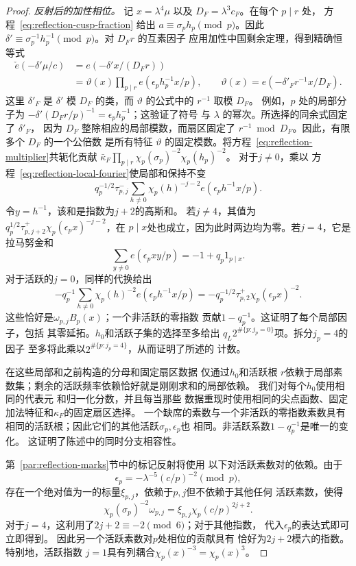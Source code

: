 \documentclass[11pt,a4paper]{article}
\numberwithin{equation}{section}
\numberwithin{figure}{section}
\theoremstyle{definition}
\theoremstyle{remark}
\begin{document}
\begin{proof}
\emph{反射后的加性相位。}
记 $x=\lambda^4\mu$ 以及 $D_F=\lambda^3c_F$。在每个 $p\mid r$ 处，
方程~\eqref{eq:reflection-cusp-fraction} 给出
$a\equiv\sigma_ph_p\pmod p$。因此
$\delta'\equiv\sigma_p^{-1}h_p^{-1}\pmod p$。对 $D_Fr$ 的互素因子
应用加性中国剩余定理，得到精确恒等式
\begin{equation}\label{eq:reflection-additive-phase}
 \begin{split}
 \check e(-\delta'\mu/c)
 &=e(-\delta'x/(D_Fr))\\
 &=\vartheta(x)\prod_{p\mid r}e(\epsilon_ph_p^{-1}x/p),
 \qquad
 \vartheta(x)=e(-\delta'_F r^{-1}x/D_F).
 \end{split}
\end{equation}
这里 $\delta'_F$ 是 $\delta'$ 模 $D_F$ 的类，而
$\vartheta$ 的公式中的 $r^{-1}$ 取模 $D_F$。
例如，$p$ 处的局部分子为
$-\delta'(D_Fr/p)^{-1}=\epsilon_ph_p^{-1}$；这验证了符号
与 $\lambda$ 的幂次。所选择的同余式固定了 $\delta'_F$，
因为 $D_F$ 整除相应的局部模数，而扇区固定了
$r^{-1}\bmod D_F$。因此，有限多个 $D_F$ 的一个公倍数
是所有特征 $\vartheta$ 的固定模数。将方程~\eqref{eq:reflection-multiplier}共轭化贡献
$\bar\kappa_F\prod_{p\mid r}\chi_p(\sigma_p)^{-2}\chi_p(h_p)^{-2}$。
对于$j\ne0$，乘以
方程~\eqref{eq:reflection-local-fourier}使局部和保持不变
\[
 q_p^{-1/2}\tau_{p,j}^{-}
 \sum_{h\ne0}\chi_p(h)^{-j-2}e(\epsilon_ph^{-1}x/p).
\]
令$y=h^{-1}$，该和是指数为$j+2$的高斯和。
若$j\ne4$，其值为
$q_p^{1/2}\tau_{p,j+2}^{+}\chi_p(\epsilon_px)^{-j-2}$，在
$p\mid x$处也成立，因为此时两边均为零。若$j=4$，它是
拉马努金和
\[
 \sum_{y\ne0}e(\epsilon_pxy/p)=-1+q_p1_{p\mid x}.
\]
对于活跃的$j=0$，同样的代换给出
\[
 -q_p^{-1}\sum_{h\ne0}\chi_p(h)^{-2}e(\epsilon_ph^{-1}x/p)
 =-q_p^{-1/2}\tau_{p,2}^{+}\chi_p(\epsilon_px)^{-2}.
\]
这些恰好是$\omega_{p,j}B_p(x)$；一个非活跃的零指数
贡献$1-q_p^{-1}$。这证明了每个局部因子，包括
其零延拓。$h_0$和活跃子集的选择至多给出
$q_L2^{\#\{p:j_p=0\}}$项。拆分$j_p=4$的因子
至多将此乘以$2^{\#\{p:j_p=4\}}$，从而证明了所述的
计数。

在这些局部和之前构造的分母和固定扇区数据
仅通过$h_0$和活跃根
$r$依赖于局部素数集；剩余的活跃频率依赖恰好就是刚刚求和的局部依赖。
我们对每个$h_0$使用相同的代表元
和归一化分数，并且每当那些
数据重现时使用相同的尖点函数、固定加法特征和$\kappa_F$的固定扇区选择。
一个缺席的素数与一个非活跃的零指数素数具有
相同的活跃根；因此它们的其他活跃$\sigma_p,\epsilon_p$也
相同。非活跃系数$1-q_p^{-1}$是唯一的变化。
这证明了陈述中的同时分支相容性。

第~\ref{par:reflection-marks}节中的标记反射将使用
以下对活跃素数对的依赖。由于
\[
 \epsilon_p=-\lambda^{-5}(c/p)^{-2}\pmod p,
\]
存在一个绝对值为一的标量$\xi_{p,j}$，依赖于$p,j$但不依赖于其他任何
活跃素数，使得
\begin{equation}\label{eq:reflection-cross-prime-phase}
 \chi_p(\sigma_p)^{-2}\omega_{p,j}
       =\xi_{p,j}\chi_p(c/p)^{2j+2}.
\end{equation}
对于$j=4$，这利用了$2j+2\equiv-2\pmod6$；对于其他指数，
代入$\epsilon_p$的表达式即可立即得到。
因此另一个活跃素数对$p$处相位的贡献具有
恰好为$2j+2$模六的指数。特别地，活跃指数
$j=1$具有列耦合$\chi_p(x)^{-3}=\chi_p(x)^3$。


\end{proof}
\end{document}

